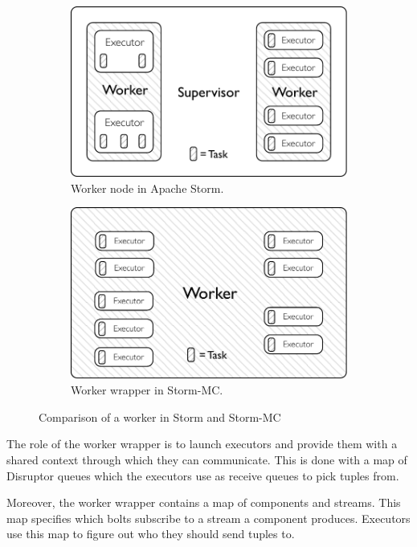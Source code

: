 \documentclass[bsc,logo,frontabs,twoside,singlespacing,normalheadings,parskip]{infthesis}\usepackage[]{graphicx}\usepackage[]{color}
\begin{document}
\begin{figure}[!htb]
\centering
\begin{subfigure}{.5\textwidth}
  \centering
  \includegraphics[width=0.95\linewidth]{pdf/distributed_worker.pdf}
  \caption{Worker node in Apache Storm.}
  \label{fig:comparison1}
\end{subfigure}\begin{subfigure}{.5\textwidth}
  \centering
  \includegraphics[width=0.95\linewidth]{pdf/local_worker.pdf}
  \caption{Worker wrapper in Storm-MC.}
  \label{fig:comparison2}
\end{subfigure}
\caption{Comparison of a worker in Storm and Storm-MC}
\label{fig:comparison}
\end{figure}

The role of the worker wrapper is to launch executors and provide them with a shared context through which they can communicate. This is done with a map of Disruptor queues which the executors use as receive queues to pick tuples from.

Moreover, the worker wrapper contains a map of components and streams. This map specifies which bolts subscribe to a stream a component produces. Executors use this map to figure out who they should send tuples to.
\end{document}
